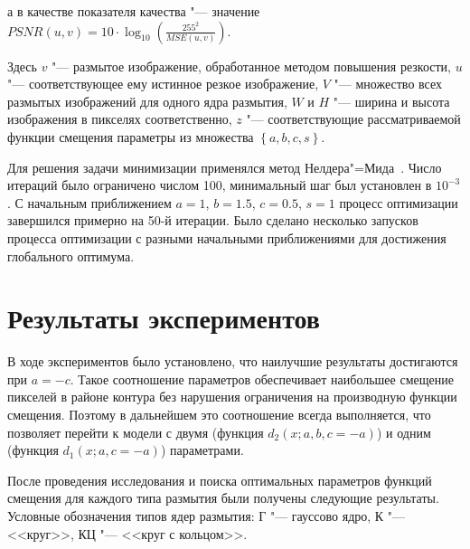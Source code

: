\noindent а в качестве показателя качества "--- значение $PSNR\left(u,v\right) = 10 \cdot \log_{10}{\left(\frac{255^2}{MSE\left(u,v\right)}\right)}$.

Здесь $v$ "--- размытое изображение, обработанное методом повышения резкости, $u$ "--- соответствующее ему истинное резкое изображение, $V$ "--- множество всех размытых изображений для одного ядра размытия, $W$ и $H$ "--- ширина и высота изображения в пикселях соответственно, $z$ "--- соответствующие рассматриваемой функции смещения параметры из множества $\left\{a, b, c, s\right\}$.

Для решения задачи минимизации применялся метод Нелдера"=Мида~\cite{10.1093/comjnl/7.4.308}. Число итераций было ограничено числом 100, минимальный шаг был установлен в $10^{-3}$. С начальным приближением $a=1$, $b=1.5$, $c=0.5$, $s=1$ процесс оптимизации завершился примерно на 50-й итерации. Было сделано несколько запусков процесса оптимизации с разными начальными приближениями для достижения глобального оптимума.

\section{Результаты экспериментов}

В ходе экспериментов было установлено, что наилучшие результаты достигаются при $a=-c$. Такое соотношение параметров обеспечивает наибольшее смещение пикселей в районе контура без нарушения ограничения на производную функции смещения. Поэтому в дальнейшем это соотношение всегда выполняется, что позволяет перейти к модели с двумя (функция $d_2(x;a,b,c=-a)$) и одним (функция $d_1(x;a,c=-a)$) параметрами.

После проведения исследования и поиска оптимальных параметров функций смещения для каждого типа размытия были получены следующие результаты. Условные обозначения типов ядер размытия: Г "--- гауссово ядро, К "--- <<круг>>, КЦ "--- <<круг с кольцом>>.



